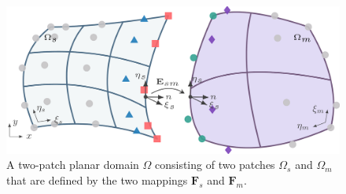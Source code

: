 \begin{figure}[ht]
  \center
  \includegraphics[scale=.4]{two-patch-mesh}
  \caption{A two-patch planar domain $\Omega$ consisting of two patches $\Omega_s$ and $\Omega_m$ that are defined by the two mappings $\mathbf{F}_s$ and $\mathbf{F}_m$.}
  \label{fig:two-patch-mesh}
\end{figure}

